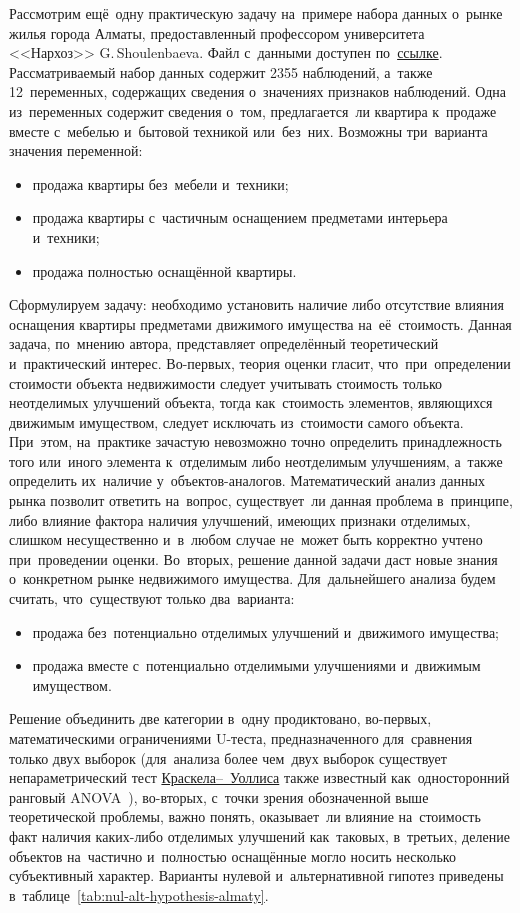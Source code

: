 \documentclass[]{scrreprt}
\begin{document}
Рассмотрим ещё~одну практическую задачу на~примере набора данных о~рынке жилья города Алматы, предоставленный профессором университета <<Нархоз>> G.\,Shoulenbaeva. Файл с~данными доступен по~\href{https://github.com/Kirill-Murashev/AI_for_valuers_book/blob/main/Parts-Chapters/Mann-Whitney-Wilcoxon/almaty-apts-2019-1.csv}{ссылке}\cite{ds:almaty-apts-2019-1}. Рассматриваемый набор данных содержит 2355 наблюдений, а~также 12~переменных, содержащих сведения о~значениях признаков наблюдений. Одна из~переменных содержит сведения о~том, предлагается~ли квартира к~продаже вместе с~мебелью и~бытовой техникой или~без~них. Возможны три~варианта значения переменной:
\begin{itemize}
	\item продажа квартиры без~мебели и~техники;
	\item продажа квартиры с~частичным оснащением предметами интерьера и~техники;
	\item продажа полностью оснащённой квартиры. 
\end{itemize}
Сформулируем задачу: необходимо установить наличие либо отсутствие влияния оснащения квартиры предметами движимого имущества на~её~стоимость. Данная задача, по~мнению автора, представляет определённый теоретический и~практический интерес. Во-первых, теория оценки гласит, что~при~определении стоимости объекта недвижимости следует учитывать стоимость только неотделимых улучшений объекта, тогда как~стоимость элементов, являющихся движимым имуществом, следует исключать из~стоимости самого объекта. При~этом, на~практике зачастую невозможно точно определить принадлежность того или~иного элемента к~отделимым либо неотделимым улучшениям, а~также определить их~наличие у~объектов-аналогов. Математический анализ данных рынка позволит ответить на~вопрос, существует~ли данная проблема в~принципе, либо влияние фактора наличия улучшений, имеющих признаки отделимых, слишком несущественно и~в~любом случае не~может быть корректно учтено при~проведении оценки. Во~вторых, решение данной задачи даст новые знания о~конкретном рынке недвижимого имущества. Для~дальнейшего анализа будем считать, что~существуют только два~варианта:
\begin{itemize}
	\item продажа без~потенциально отделимых улучшений и~движимого имущества;
	\item продажа вместе с~потенциально отделимыми улучшениями и~движимым имуществом.
\end{itemize}
Решение объединить две категории в~одну продиктовано, во-первых, математическими ограничениями U-теста, предназначенного для~сравнения только двух выборок (для~анализа более чем~двух выборок существует непараметрический тест \href{https://en.wikipedia.org/wiki/Kruskal–Wallis_one-way_analysis_of_variance}{Краскела--~Уоллиса} также известный как~односторонний ранговый ANOVA~\cite{Wiki:Kruskal-Wallis}), во-вторых, с~точки зрения обозначенной выше теоретической проблемы, важно понять, оказывает~ли влияние на~стоимость факт наличия каких-либо отделимых улучшений как~таковых, в~третьих, деление объектов на~частично и~полностью оснащённые могло носить несколько субъективный характер. Варианты нулевой и~альтернативной гипотез приведены в~таблице~\ref{tab:nul-alt-hypothesis-almaty}.
\end{document}
